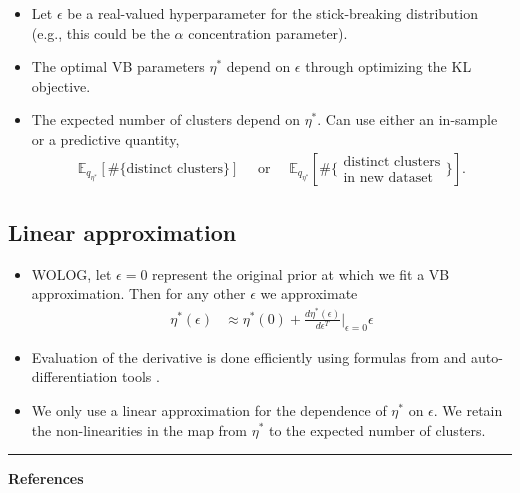 \documentclass[a0,plainsections,30pt]{sciposter}\usepackage[]{graphicx}\usepackage[]{color}
\newcommand{\Expect}{\mathbb{E}}
\begin{document}
\begin{minipage}[t]{0.45\textwidth}
\begin{itemize}
\item Let $\epsilon$ be a real-valued hyperparameter for the stick-breaking distribution
(e.g., this could be the $\alpha$ concentration parameter).

\item The optimal VB parameters $\eta^*$ depend on $\epsilon$ through optimizing the KL objective.

\item The expected number of clusters depend on $\eta^*$. Can use either an in-sample or a predictive quantity,
\vspace{-0.1in}
\begin{align}
\Expect_{q_{\eta^*}} \left[ \#\{\text{distinct clusters}\} \right]
\quad \text{ or } \quad
\Expect_{q_{\eta^*}}
\left[\#\{\substack{\text{distinct clusters}\\\text{in new dataset}}\} \right].
\end{align}
\end{itemize}

\vspace{-0.9in}
\subsection*{Linear approximation}
\vspace{-0.2in}
\begin{itemize}
\item WOLOG, let $\epsilon=0$ represent the original prior at which we fit a VB approximation. Then for any other $\epsilon$ we approximate
\begin{align}
\eta^*(\epsilon)  &\approx  \eta^*(0) +
\frac{d \eta^*(\epsilon)}{d\epsilon^T}\Big|_{\epsilon=0} \epsilon
\label{eq:linear_approx}
\end{align}

\item Evaluation of the derivative is done efficiently using formulas from \cite{giordano:2017:covariances} and auto-differentiation tools \cite{maclaurin:2015:autograd}.

\item We only use a linear approximation for the dependence of $\eta^*$ on $\epsilon$. We retain the non-linearities in the map from $\eta^*$ to the expected number of clusters.

\end{itemize}

\begin{center}
\noindent\rule{0.6\textwidth}{1pt}
\end{center}
{\bf References}
\renewcommand{\section}[2]{}%
\footnotesize{
  
  
}

\end{minipage}
\end{document}
